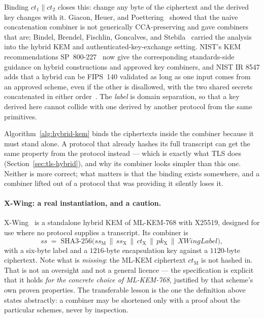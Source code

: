 Binding $ct_1 \| ct_2$ closes this: change any byte of the ciphertext and the
derived key changes with it. Giacon, Heuer, and Poettering~\cite{ghp2018} showed
that the naive concatenation combiner is not generically CCA-preserving and gave
combiners that are; Bindel, Brendel, Fischlin, Goncalves, and
Stebila~\cite{bbfgs2019} carried the analysis into the hybrid KEM and
authenticated-key-exchange setting. NIST's KEM recommendations
SP~800-227~\cite{nistsp800227} now give the corresponding standards-side guidance
on hybrid constructions and approved key combiners, and NIST IR 8547 adds that a
hybrid can be FIPS~140 validated as long as one input comes from an approved
scheme, even if the other is disallowed, with the two shared secrets concatenated
in either order~\cite{nistir8547}. The \emph{label} is domain
separation, so that a key derived here cannot collide with one derived by another
protocol from the same primitives.

\begin{remark}
Algorithm~\ref{alg:hybrid-kem} binds the ciphertexts inside the combiner because
it must stand alone. A protocol that already hashes its full transcript can get
the same property from the protocol instead --- which is exactly what TLS does
(Section~\ref{sec:tls-hybrid}), and why its combiner looks simpler than this one.
Neither is more correct; what matters is that the binding exists somewhere, and a
combiner lifted out of a protocol that was providing it silently loses it.
\end{remark}

\paragraph{X-Wing: a real instantiation, and a caution.}
X-Wing~\cite{xwing2024} is a standalone hybrid KEM of ML-KEM-768 with X25519,
designed for use where no protocol supplies a transcript. Its combiner is
\[
  ss \;=\; \mathrm{SHA3\text{-}256}\big(ss_{\mathrm{M}} \,\|\, ss_{\mathrm{X}} \,\|\, ct_{\mathrm{X}} \,\|\, pk_{\mathrm{X}} \,\|\, \textit{XWingLabel}\big),
\]
with a six-byte label and a $1216$-byte encapsulation key against a $1120$-byte
ciphertext. Note what is \emph{missing}: the ML-KEM ciphertext $ct_{\mathrm{M}}$
is not hashed in. That is not an oversight and not a general licence --- the
specification is explicit that it holds \emph{for the concrete choice of
ML-KEM-768}, justified by that scheme's own proven properties. The transferable
lesson is the one the definition above states abstractly: a combiner may be
shortened only with a proof about the particular schemes, never by inspection.

